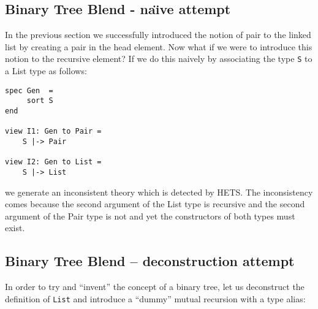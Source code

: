 \documentclass{my-blue-book}
\begin{document}
\subsection{Binary Tree Blend - na{\"\i}ve attempt}

In the previous section we successfully introduced the notion of pair to the linked list by creating a pair in the head element. Now what if we were to introduce this notion to the recursive element? If we do this naively by associating the type {\tt S} to a List type as follows:
\begin{verbatim}
spec Gen  = 
     sort S
end

view I1: Gen to Pair = 
    S |-> Pair

view I2: Gen to List =
    S |-> List
\end{verbatim}
we generate an inconsistent theory which is detected by HETS. The inconsistency comes because the second argument of the List type is recursive and the second argument of the Pair type is not and yet the constructors of both types must exist.

\subsection{Binary Tree Blend -- deconstruction attempt}

In order to try and ``invent'' the concept of a binary tree, let us deconstruct the definition of {\tt List} and introduce a ``dummy'' mutual recursion with a type alias:
\end{document}
